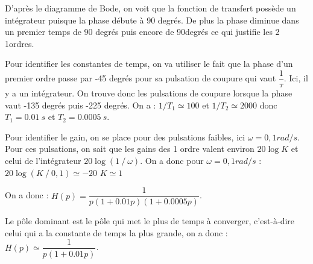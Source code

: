 \fi





\ifprof
\begin{corrige}
D’après le diagramme de Bode, on voit que la fonction de transfert possède un intégrateur puisque la phase débute à 90 degrés. De plus la phase diminue dans un premier temps de 90 degrés puis encore de 90degrés ce qui justifie les 2 1\ier ordres.

Pour identifier les constantes de temps, on va utiliser le fait que la phase d’un premier ordre passe par -45 degrés pour sa pulsation de coupure qui vaut $\dfrac{1}{\tau}$.
Ici, il y a un intégrateur. On trouve donc les pulsations de coupure lorsque la phase vaut -135 degrés puis -225 degrés. On a :
$1/T_1 \simeq 100$      et      $1/T_2 \simeq 2000$     donc    $T_1=\SI{0.01}{s}$ et
$T_2=\SI{0.0005}{s}$.

Pour identifier le gain, on se place pour des pulsations faibles, ici $\omega =0,1 rad/s$. Pour ces pulsations, on sait que les gains des 1\ier{} ordre valent environ $20\log K$ et celui de l’intégrateur $20\log(1⁄\omega)$. On a donc pour $\omega=0,1 rad/s$ :
$20 \log(K⁄0,1) \simeq -20 $  $K\simeq 1$

On a donc : $H(p)=\dfrac{1}{p(1+0.01p)(1+0.0005p)}$.

Le pôle dominant est le pôle qui met le plus de temps à converger, c’est-à-dire celui qui a la constante de temps la plus grande, on a donc :
$H(p)\simeq \dfrac{1}{p(1+0.01p)}$.
\end{corrige}
\else
